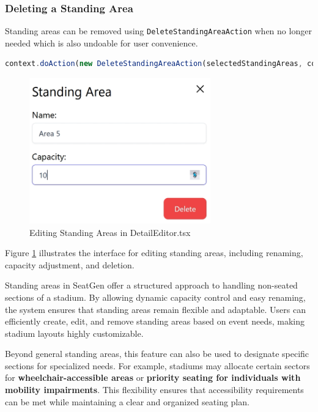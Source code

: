\subsubsection{Deleting a Standing Area}
Standing areas can be removed using \texttt{DeleteStandingAreaAction} when no longer needed which is also undoable for user convenience.

\begin{lstlisting}[language=TypeScript, caption=Deleting Standing Areas, label=lst:delete-standingarea]
context.doAction(new DeleteStandingAreaAction(selectedStandingAreas, context))

\end{lstlisting}

\begin{figure}[H]
    \centering
    \includegraphics[width=0.7\textwidth]{pics/DetailEditorStandingArea.png}
    \caption{Editing Standing Areas in DetailEditor.tsx}
    \label{fig:detail-editor-standingarea}
\end{figure}

Figure \ref{fig:detail-editor-standingarea} illustrates the interface for editing standing areas, including renaming, capacity adjustment, and deletion.

Standing areas in SeatGen offer a structured approach to handling non-seated sections of a stadium. By allowing dynamic capacity control and easy renaming, the system ensures that standing areas remain flexible and adaptable. Users can efficiently create, edit, and remove standing areas based on event needs, making stadium layouts highly customizable.

Beyond general standing areas, this feature can also be used to designate specific sections for specialized needs. For example, stadiums may allocate certain sectors for \textbf{wheelchair-accessible areas} or \textbf{priority seating for individuals with mobility impairments}. This flexibility ensures that accessibility requirements can be met while maintaining a clear and organized seating plan.

